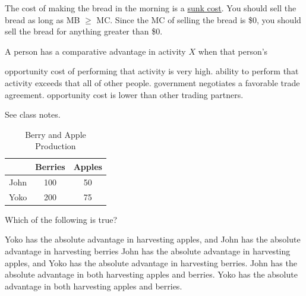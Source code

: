 \documentclass[addpoints,11pt]{exam}
\theoremstyle{definition}
\begin{document}
\begin{questions}
		\begin{solution}
			The cost of making the bread in the morning is a \underline{sunk cost}. You should sell the bread as long as MB $\ge$ MC. Since the MC of selling the bread is \$0, you should sell the bread for anything greater than \$0.
		\end{solution}
		
\newpage

		\question A person has a comparative advantage in activity $X$ when that person's
		\begin{choices}
			\choice opportunity cost of performing that activity is very high.
			\choice ability to perform that activity exceeds that all of other people.
			\choice government negotiates a favorable trade agreement.
			\CorrectChoice opportunity cost is lower than other trading partners.
		\end{choices}
		
		\begin{solution}
			See class notes.
		\end{solution}


		
\begin{table}[ht]
	\caption*{Berry and Apple Production}
	\centering
	\begin{tabular}{  c| c  c }        
		
		& Berries & Apples \\
		\hline
		John & 100 & 50 \\
		
		Yoko  & 200 & 75 \\
		
	\end{tabular}
\end{table}

	\question \label{blah1} Which of the following is true?
		\begin{choices}
			\choice Yoko has the absolute advantage in harvesting apples, and John has the absolute advantage in harvesting berries
			\choice John has the absolute advantage in harvesting apples, and Yoko has the absolute
			advantage in harvesting berries.
			\choice John has the absolute advantage in both harvesting apples and berries.
			\CorrectChoice Yoko has the absolute advantage in both harvesting apples and berries.
		\end{choices}
		

\end{questions}
\end{document}
